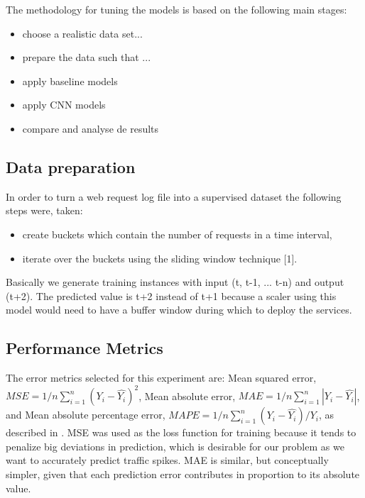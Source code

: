 

\cite{KWQH18}

The  methodology for tuning the models is based on the following main stages:

\begin{itemize}
    \item choose a realistic data set...
    \item prepare the data such that ...
   \item apply baseline models
   \item apply CNN models
   \item compare and analyse de results
\end{itemize}

\subsection*{Data preparation}

 In order to turn a web request log file into a supervised dataset the following steps were,
    taken: 
\begin{itemize}
\item create buckets which contain the number of requests in a
time interval, 
\item iterate over the buckets using the sliding window technique [1]. 
\end{itemize}

Basically
we generate training instances with input (t, t-1, ... t-n) and output (t+2). The predicted
value is t+2 instead of t+1 because a scaler using this model would need to have a buffer
window during which to deploy the services.

\subsection{Performance Metrics}
The error metrics selected for this experiment are: 
Mean squared error, $MSE=1/n \sum_{i=1}^{n}(Y_i - \hat{Y_i})^2$, 
Mean absolute error, $MAE=1/n \sum_{i=1}^{n}|Y_i - \hat{Y_i}|$, 
and Mean absolute percentage error, 
$MAPE=1/n \sum_{i=1}^{n}(Y_i - \hat{Y_i})/Y_i$,
 as described in \cite{error_metrics}. MSE was used as the 
loss function for training because it tends to penalize big deviations in prediction, which is desirable for 
our problem as we want to accurately predict traffic spikes. MAE is similar, but conceptually simpler, 
given that each prediction error contributes in proportion to its absolute value. 

